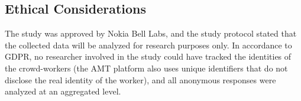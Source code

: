 \subsection{Ethical Considerations}
The study was approved by Nokia Bell Labs, and the study protocol stated that the collected data will be analyzed for research purposes only. In accordance to GDPR, no researcher involved in the study could have tracked the identities of the crowd-workers (the AMT platform also uses unique identifiers that do not disclose the real identity of the worker), and all anonymous responses were analyzed at an aggregated level. 